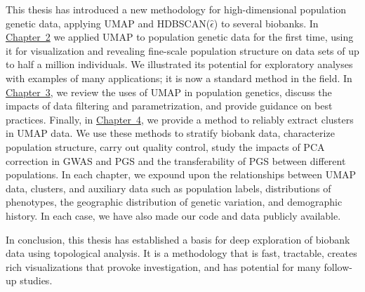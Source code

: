 This thesis has introduced a new methodology for high-dimensional population genetic data, applying UMAP and HDBSCAN($\hat{\epsilon}$) to several biobanks. In \hyperref[chap:chapter2]{Chapter~2} we applied UMAP to population genetic data for the first time, using it for visualization and revealing fine-scale population structure on data sets of up to half a million individuals. We illustrated its potential for exploratory analyses with examples of many applications; it is now a standard method in the field. In \hyperref[chap:chapter3]{Chapter~3}, we review the uses of UMAP in population genetics, discuss the impacts of data filtering and parametrization, and provide guidance on best practices. Finally, in \hyperref[chap:chapter4]{Chapter~4}, we provide a method to reliably extract clusters in UMAP data. We use these methods to stratify biobank data, characterize population structure, carry out quality control, study the impacts of PCA correction in GWAS and PGS and the transferability of PGS between different populations. In each chapter, we expound upon the relationships between UMAP data, clusters, and auxiliary data such as population labels, distributions of phenotypes, the geographic distribution of genetic variation, and demographic history. In each case, we have also made our code and data publicly available. 

In conclusion, this thesis has established a basis for deep exploration of biobank data using topological analysis. It is a methodology that is fast, tractable, creates rich visualizations that provoke investigation, and has potential for many follow-up studies.